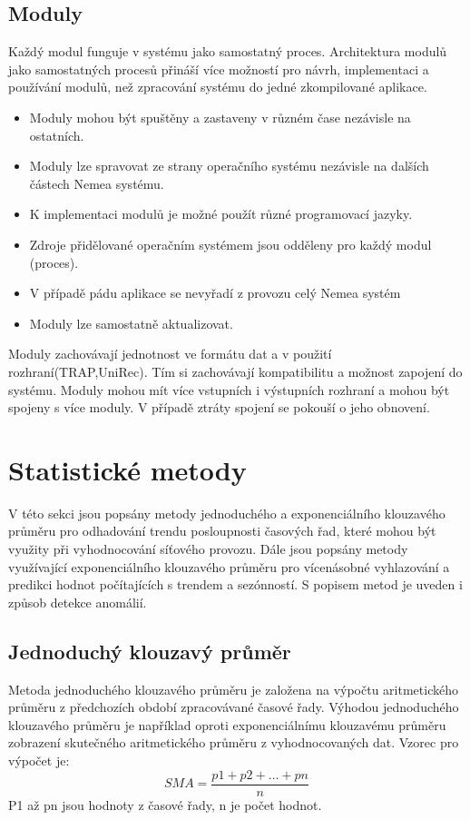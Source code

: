 \documentclass[thesis=M,czech]{FITthesis}[2012/06/26]
\begin{document}
\subsection{Moduly}
Každý modul funguje v systému jako samostatný proces. Architektura modulů jako samostatných procesů přináší více možností pro návrh, implementaci a používání modulů, než zpracování systému do jedné zkompilované aplikace.
\begin{itemize}
	\item Moduly mohou být spuštěny a zastaveny v různém čase nezávisle na ostatních.
	\item Moduly lze spravovat ze strany operačního systému nezávisle na dalších částech Nemea systému.
	\item K implementaci modulů je možné použít různé programovací jazyky. 
	\item Zdroje přidělované operačním systémem jsou odděleny pro každý modul (proces).
	\item V případě pádu aplikace se nevyřadí z provozu celý Nemea systém
	\item Moduly lze samostatně aktualizovat.
\end{itemize}
Moduly zachovávají jednotnost ve formátu dat a v použití rozhraní(TRAP,UniRec). Tím si zachovávají kompatibilitu a možnost zapojení do systému. Moduly mohou mít více vstupních i výstupních rozhraní a mohou být spojeny s více moduly. V případě ztráty spojení se pokouší o jeho obnovení. 

\section{Statistické metody}
\label{statistickemetody}
V této sekci jsou popsány metody jednoduchého a exponenciálního klouzavého průměru pro odhadování trendu posloupnosti časových řad, které mohou být využity při vyhodnocování síťového provozu. Dále jsou popsány metody využívající exponenciálního klouzavého průměru pro vícenásobné vyhlazování a predikci hodnot počítajících s trendem a sezónností. S popisem metod je uveden i způsob detekce anomálií.\cite{exponentialsmoothing}
\subsection{Jednoduchý klouzavý průměr}
Metoda jednoduchého klouzavého průměru je založena na výpočtu aritmetického průměru z předchozích období zpracovávané časové řady. Výhodou jednoduchého klouzavého průměru je například oproti exponenciálnímu klouzavému průměru zobrazení skutečného aritmetického průměru z vyhodnocovaných dat.\cite{movingaverages} Vzorec pro výpočet je: 
\[ SMA = \frac{p1 + p2 + \dots + pn}{n} \]
P1 až pn jsou hodnoty z časové řady, n je počet hodnot.
\end{document}
